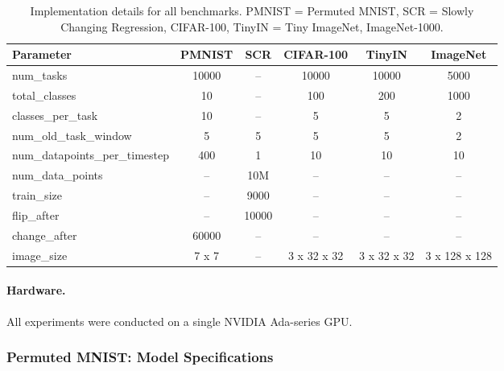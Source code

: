 \documentclass{article}
\begin{document}
\begin{table}[ht]
\caption{Implementation details for all benchmarks. PMNIST = Permuted MNIST, SCR = Slowly Changing Regression, CIFAR-100, TinyIN = Tiny ImageNet, ImageNet-1000.}
\label{tab:implementation_details}

\centering
\footnotesize
\setlength{\tabcolsep}{3pt}

\begin{tabular}{lccccc}
\toprule
\textbf{Parameter} & \textbf{PMNIST} & \textbf{SCR} & \textbf{CIFAR-100} & \textbf{TinyIN} & \textbf{ImageNet} \\
\midrule
num\_tasks                     & 10000  & --     & 10000  & 10000  & 5000 \\
total\_classes                 & 10     & --     & 100    & 200    & 1000 \\
classes\_per\_task             & 10     & --     & 5      & 5      & 2 \\
num\_old\_task\_window         & 5      & 5      & 5      & 5      & 2 \\
num\_datapoints\_per\_timestep & 400    & 1      & 10     & 10     & 10 \\
num\_data\_points              & --     & 10M    & --     & --     & -- \\
train\_size                    & --     & 9000   & --     & --     & -- \\
flip\_after                    & --     & 10000  & --     & --     & -- \\
change\_after                  & 60000  & --     & --     & --     & -- \\
image\_size                    & 7 x 7  & --     & 3 x 32 x 32 & 3 x 32 x 32 & 3 x 128 x 128 \\
\bottomrule
\end{tabular}

\end{table}


\paragraph{Hardware.}
All experiments were conducted on a single NVIDIA Ada-series GPU.

\subsubsection{Permuted MNIST: Model Specifications}
\end{document}
